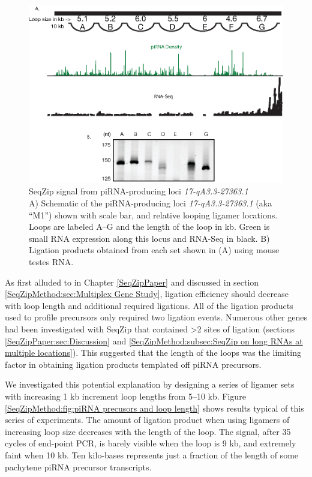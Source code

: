     \begin{figure} %
        \centering 
        \includegraphics{Figures/SeqZipMethod/piRNAPrecurserAnalyisBySeqZip.eps}
        \caption[SeqZip signal from piRNA-producing loci \textit{17-qA3.3-27363.1}]
        {
          SeqZip signal from piRNA-producing loci \textit{17-qA3.3-27363.1}\\[0.25cm]
          A) Schematic of the piRNA-producing loci \textit{17-qA3.3-27363.1} (aka ``M1'') shown with scale bar, and relative looping ligamer locations.  Loops are labeled A--G and the length of the loop in kb.  Green is small RNA expression along this locus and RNA-Seq in black. B) Ligation products obtained from each set shown in (A) using mouse testes RNA.
        	}
        \label{SeqZipMethod:fig:M1 analysis by SeqZip}
      	\end{figure}

    As first alluded to in Chapter \ref{SeqZipPaper} and discussed in section \ref{SeqZipMethod:sec:Multiplex Gene Study}, ligation efficiency should decrease with loop length and additional required ligations. All of the ligation products used to profile precursors only required two ligation events. Numerous other genes had been investigated with SeqZip that contained >2 sites of ligation (sections \ref{SeqZipPaper:sec:Discussion} and \ref{SeqZipMethod:subsec:SeqZip on long RNAs at multiple locations}). This suggested that the length of the loops was the limiting factor in obtaining ligation products templated off piRNA precursors.

    We investigated this potential explanation by designing a series of ligamer sets with increasing 1 kb increment loop lengths from 5--10 kb. Figure \ref{SeqZipMethod:fig:piRNA precusors and loop length} shows results typical of this series of experiments. The amount of ligation product when using ligamers of increasing loop size decreases with the length of the loop. The signal, after 35 cycles of end-point PCR, is barely visible when the loop is 9 kb, and extremely faint when 10 kb. Ten kilo-bases represents just a fraction of the length of some pachytene piRNA precursor transcripts. 

